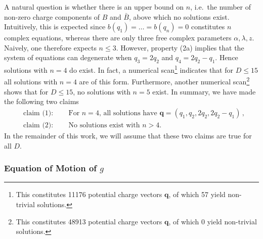 \documentclass[11pt,a4paper]{article}
\numberwithin{equation}{section}
\numberwithin{table}{section}\setlength{\multlinegap}{25pt}
\begin{document}
A natural question is whether there is an upper bound on $n$, i.e.~the number of non-zero charge components of $B$ and $\bar{B}$, above which no solutions exist. Intuitively, this is expected since $b(q_1)=\ldots=b(q_n)=0$ constitutes $n$ complex equations, whereas there are only three free complex parameters $\alpha,\lambda, z$. Naively, one therefore expects $n\leq 3$. However, property (2a) implies that the system of equations can degenerate when $q_3=2q_2$ and $q_4=2q_2-q_1$. Hence solutions with $n=4$ do exist. In fact, a numerical scan\footnote{This constitutes 11176 potential charge vectors $\mathbf{q}$, of which 57 yield non-trivial solutions.} indicates that for $D\leq 15$ all solutions with $n=4$ are of this form. Furthermore, another numerical scan\footnote{This constitutes 48913 potential charge vectors $\mathbf{q}$, of which 0 yield non-trivial solutions.} shows that for $D\leq 15$, no solutions with $n=5$ exist. In summary, we have made the following two claims
\begin{align}
	&\text{claim (1)}:\qquad \text{For $n=4$, all solutions have $\mathbf{q}=(q_1, q_2, 2q_2, 2q_2-q_1)$}\,,\\
	&\text{claim (2)}:\qquad \text{No solutions exist with $n>4$.}
\end{align}
In the remainder of this work, we will assume that these two claims are true for all $D$. 

\subsubsection*{Equation of Motion of $g$}
\end{document}
